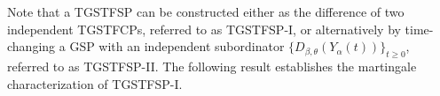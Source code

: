 \documentclass[11pt,oneside,reqno]{amsart}
\theoremstyle{definition}
\newtheorem{theorem}{\bf Theorem}[section]
\theoremstyle{remarkstyle}
\begin{document}
Note that a TGSTFSP can be constructed either as the difference of two independent TGSTFCPs, referred to as TGSTFSP-I, or alternatively by time-changing a GSP with an independent subordinator $\{D_{\beta,\theta}(Y_\alpha(t))\}_{t\ge 0}$, referred to as TGSTFSP-II. The following result establishes the martingale characterization of TGSTFSP-I.
\end{document}
